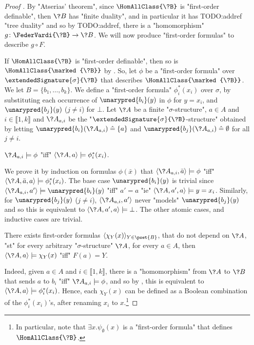 \begin{proof}[Proof ]
	By "Atserias' theorem", since $\HomAllClass{\?B}$ is "first-order definable",
	then $\?B$ has "finite duality", and in particular it has TODO:addref
	"tree duality" and so by TODO:addref, there is a "homomorphism"
	$g\colon \FederVardi{\?B} \to \?B$.
	We will now produce "first-order formulas" to describe $g \circ F$.

	If $\HomAllClass{\?B}$ is "first-order definable", then so is
	$\HomAllClass{\marked{\?B}}$ by .
	So, let $\phi$ be a "first-order formula" over $\extendedSignature{\sigma}{\?B}$
	that describes $\HomAllClass{\marked{\?B}}$. We let $B = \{b_1,\hdots,b_k\}$.
	We define a "first-order formula" $\phi^*_i(x_i)$ over $\sigma$,
	by substituting each occurrence of $\unarypred{b_i}(y)$ in $\phi$ for $y = x_i$,
	and $\unarypred{b_j}(y)$ ($j \neq i$) for $\bot$.
	Let $\?A$ be a finite "$\sigma$-structure", $a\in A$ and $i \in \lBrack 1,k\rBrack$
	and $\?A_{a,i}$ be the
	"$\extendedSignature{\sigma}{\?B}$-structure" obtained by letting 
	$\unarypred{b_i}(\?A_{a,i}) \defeq \{a\}$
	and $\unarypred{b_j}(\?A_{a,i}) \defeq \emptyset$ for all $j \neq i$.

	\begin{claim}
		\AP\label{claim:finite-duality-uniformly-definable-homomorphisms-new-formulas}
		$\?A_{a,i} \models \phi$
		"iff" $\langle \?A, a \rangle \models \phi^*_i(x_i)$.
	\end{claim}
	We prove it by induction on formulas $\phi(\bar x)$
	that $\langle\?A_{a,i}, \bar a \rangle \models \phi$
		"iff" $\langle \?A, \bar a, a \rangle \models \phi^*_i(x_i)$.
	The base case $\unarypred{b_i}(y)$ is trivial since
	$\langle \?A_{a,i}, a' \rangle \models \unarypred{b_i}(y)$ "iff"
	$a' = a$ "ie" $\langle \?A, a', a \rangle \models y = x_i$.
	Similarly, for  $\unarypred{b_j}(y)$ ($j \neq i$),
	$\langle \?A_{a,i}, a' \rangle$ never "models" $\unarypred{b_j}(y)$
	and so this is equivalent to $\langle \?A, a', a \rangle \models \bot$.
	The other atomic cases, and inductive cases are trivial.

	\begin{claim}
		\AP\label{claim:finite-duality-uniformly-definable-homomorphisms-formulas}
		There exists first-order formulas $\langle \chi_Y(x)\rangle_{Y\in \pset{B}}$,
		that do not depend on $\?A$, "st" for every arbitrary "$\sigma$-structure" $\?A$,
		for every $a\in A$, then $\langle \?A,a \rangle \models \chi_Y(x)$ "iff"
		$F(a) = Y$.
	\end{claim}
	Indeed, given $a\in A$ and $i \in \lBrack 1,k\rBrack$, there is a "homomorphism" from $\?A$
	to $\?B$ that sends $a$ to $b_i$ "iff" $\?A_{a,i} \models \phi$, and so by , this is equivalent to
	$\langle \?A,a\rangle \models \phi^*_i(x_i)$. Hence, each $\chi_Y(x)$ can be defined as
	a Boolean combination of the $\phi^*_i(x_i)$'s, after renaming $x_i$ to $x$.\footnote{In 
	particular, note that $\exists x.\psi_\emptyset(x)$ is a "first-order formula"
	that defines $\HomAllClass{\?B}$.}


\end{proof}
